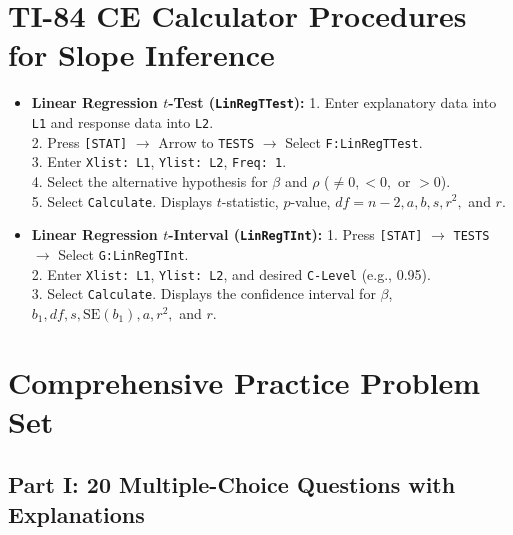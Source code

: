 \section{TI-84 CE Calculator Procedures for Slope Inference}
\begin{calculatorbox}
\begin{itemize}[leftmargin=1.2em]
  \item \textbf{Linear Regression $t$-Test (\texttt{LinRegTTest}):}
  1. Enter explanatory data into \texttt{L1} and response data into \texttt{L2}.\\
  2. Press \texttt{[STAT]} $\to$ Arrow to \texttt{TESTS} $\to$ Select \texttt{F:LinRegTTest}.\\
  3. Enter \texttt{Xlist: L1}, \texttt{Ylist: L2}, \texttt{Freq: 1}.\\
  4. Select the alternative hypothesis for $\beta$ and $\rho$ ($\neq 0, < 0,$ or $> 0$).\\
  5. Select \texttt{Calculate}. Displays $t$-statistic, $p$-value, $df = n - 2, a, b, s, r^2,$ and $r$.
  \item \textbf{Linear Regression $t$-Interval (\texttt{LinRegTInt}):}
  1. Press \texttt{[STAT]} $\to$ \texttt{TESTS} $\to$ Select \texttt{G:LinRegTInt}.\\
  2. Enter \texttt{Xlist: L1}, \texttt{Ylist: L2}, and desired \texttt{C-Level} (e.g., 0.95).\\
  3. Select \texttt{Calculate}. Displays the confidence interval for $\beta$, $b_1, df, s, \text{SE}(b_1), a, r^2,$ and $r$.
\end{itemize}
\end{calculatorbox}

\section{Comprehensive Practice Problem Set}

\subsection*{Part I: 20 Multiple-Choice Questions with Explanations}

